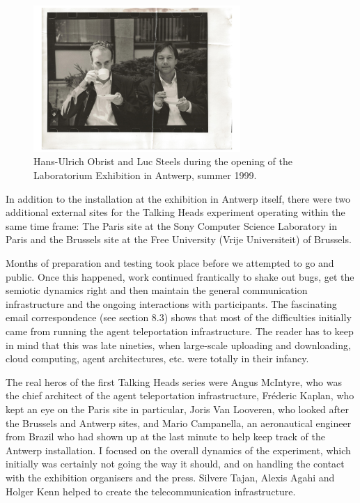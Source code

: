 \begin{figure}[htbp]
  \centerline{\includegraphics[width=0.7\textwidth]{chap8/figures/hu-obrist+ls.pdf}}
\caption{\label{fig:faces}Hans-Ulrich Obrist and Luc Steels during the opening of the Laboratorium Exhibition in Antwerp, summer 1999. }
\end{figure}
In addition to the installation at the exhibition in Antwerp itself, there were two additional 
external sites for the Talking Heads experiment operating within the same time frame: The Paris site at the Sony Computer 
Science Laboratory in Paris and the Brussels site at the Free University (Vrije Universiteit) of Brussels.

Months of preparation and testing took place before we attempted to go  and public. 
Once this happened, work continued frantically to shake out bugs, get the semiotic dynamics right
and then maintain the general communication infrastructure and the ongoing interactions with participants. 
The fascinating email correspondence (see section 8.3) shows that most of the difficulties initially came 
from running the agent teleportation infrastructure. The reader has to keep in mind that this was 
late nineties, when large-scale uploading 
and downloading, cloud computing, agent architectures, etc. were totally in their infancy. 

The real heros of the first Talking Heads series were
Angus McIntyre, who was the chief architect of the agent teleportation infrastructure, 
Fr\'{e}deric Kaplan, who kept an eye on the Paris site in particular, Joris Van Looveren, who looked after the 
Brussels and Antwerp sites, and Mario Campanella, an aeronautical engineer from Brazil who 
had shown up at the last minute to 
help keep track of the Antwerp installation. I focused on the overall dynamics of the experiment, which 
initially was certainly not going the way it should, and on handling the contact with the exhibition organisers and 
the press. Silvere Tajan, Alexis Agahi and Holger Kenn helped to create the telecommunication infrastructure. 
